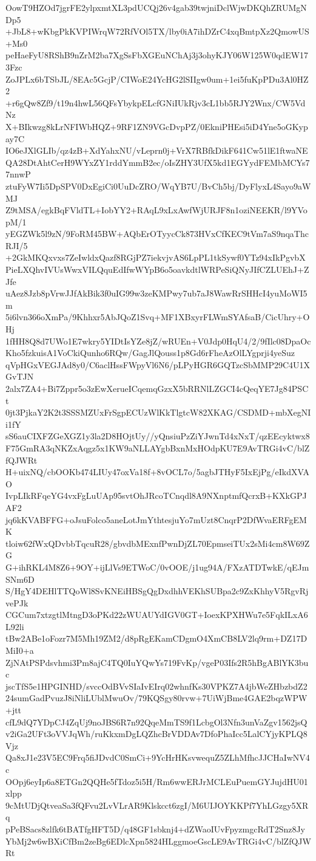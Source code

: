OowT9HZOd7jgrFE2ylpxmtXL3pdUCQj26v4gab39twjniDclWjwDKQhZRUMgNDp5
+JbL8+wKbgPkKVPIWrqW72RfVOl5TX/lby0iA7ihDZrC4xqBmtpXz2QmowUS+Ms0
peHaeFyU8RShB9nZrM2ba7XgSsFbXGEuNChAj3j3ohyKJY06W125W0qdEW173Fzc
ZoJPLx6bTSbJL/8EAc5GcjP/CIWoE24YcHG2lSIIgw0um+1ei5fuKpPDu3Al0HZ2
+r6gQw8Zf9/t19n4hwL56QFsYbykpELcfGNiIUkRjv3cL1bb5RJY2Wnx/CW5VdNz
X+BIkwzg8kLrNFIWbHQZ+9RF1ZN9VGcDvpPZ/0EkniPHEsi5iD4Yne5oGKypay7C
IO6eJXlGLIb/qz4zB+XdYahxNU/vLeprn0j+VrX7RBfkDikF641Cw51lE1ftwaNE
QA28DtAhtCerH9WYxZY1rddYmmB2ec/oIsZHY3UfX5kd1EGYydFEMbMCYs77nnwP
ztuFyW7Ii5DpSPV0DxEgiCi0UuDcZRO/WqYB7U/BvCh5bj/DyFlyxL4Sayo9aWMJ
Z9tMSA/egkBqFVldTL+IobYY2+RAqL9xLxAwfWjURJF8n1oziNEEKR/l9YVopM/1
yEGZWk5l9zN/9FoRM45BW+AQbErOTyycCk873HVxCfKEC9tVm7aS9nqaThcRJI/5
+2GkMKQxvxs7ZeIwldxQazf8RGjPZ7iekvjvAS6LpPL1tkSywf0YTz94xIkPgvbX
PieLXQhvIVUsWwxVILQquEdIfwWYpB6o5oavkdtlWRPeSiQNyJIfCZLUEhJ+ZJfe
uAez8Jzb8pVrwJJfAkBik3f0uIG99w3zeKMPwy7ub7aJ8WawRrSHHcI4yuMoWI5m
5i6lvn366oXmPa/9Khhxr5AbJQoZ1Svq+MF1XBxyrFLWmSYAfsaB/CicUhry+OHj
1fHH8Q8d7UWo1E7wkry5YIDtIsYZe8jZ/wRUEn+V0Jdp0HqU4/2/9fIlc08DpaOc
Kho5fzkuisA1VoCkiQunho6RQw/GagJlQouss1p8Gd6rFheAzOlLYgprji4yeSuz
qVpHGxVEGJAd8y0/C6aclHssFWpyVl6N6/pLPyHGR6GQTzcSbMMP29C4U1XGvTJN
2alx7ZA4+Bi7Zppr5o3zEwXerueICqemqGzxX5bRRNlLZGCI4cQeqYE7Jg84PSCt
0jt3PjkaY2K2t3SSSMZUxFrSgpECUzWlKkTlgtcW82XKAG/CSDMD+mbXegNIi1fY
sS6auCIXFZGeXGZ1y3la2D8HOjtUy//yQnsiuPzZiYJwnTd4xNxT/qzEEcyktwx8
F75GmRA3qNKZxAqgz5x1KW9aNLLAYgbBxnMxHOdpKU7E9AvTRGi4vC/blZfQJWRt
H+uixNQ/cbOOKb474LIUy47oxVa18f+8vOCL7o/5agbJTHyF5IxEjPg/eIkdXVAO
IvpLIkRFqeYG4vxFgLuUAp95svtOhJRcoTCnqdl8A9NXnptmfQcrxB+KXkGPJAF2
jq6kKVABFFG+oJsuFolco5aneLotJmYthtesjuYo7mUzt8CnqrP2DfWvaERFgEMK
tloiw62fWxQDvbbTqcuR28/gbvdbMExnfPwnDjZL70EpmseiTUx2sMi4cm8W69ZG
G+ihRKL4M8Z6+9OY+ijLlVs9ETWoC/0vOOE/j1ug94A/FXzATDTwkE/qEJmSNm6D
S/HgY4DEHlTTQoWl8SvKNEiHBSgQgDxdhhVEKhSUBpa2c9ZxKhhyV5RgvRjvePJk
CGCum7xtzgtlMtngD3oPKd22zWUAUYdIGV0GT+IoexKPXHWu7e5FqkILxA6L92li
tBw2ABe1oFozr7M5Mh19ZM2/d8pRgEKamCDgmO4XmCB8LV2lq9rm+DZ17DMiI0+a
ZjNAtPSPdsvhmi3Pm8ajC4TQ0IuYQwYs719FvKp/vgeP03Ifs2R5hBgABlYK3buc
jscTfS5e1HPGINHD/svccOdBVvSIaIvEIrq02whnfKs30VPKZ7A4jbWeZHbzbdZ2
24sumGadPvuzJ8iNliLUblMwuOv/79KQSgy80rvw+7UiWjBme4GAE2bqzWPW+jtt
cfL9dQ7YDpCJ4ZqUj9noJBS6R7n92QqeMmTS9f1LcbgOl3Nfn3unVaZgv1562jsQ
v2iGa2UFt3oVVJqWh/ruKkxmDgLQZhcBrVDDAv7DfoPhaIcc5LalCYjyKPLQ8Vjz
Qa8xJ1e23V5EC9Frq5fiJDvdC0SmCi+9YcHrHKsvwequZ5ZLhMfhcJJCHaIwNV4c
OOpj6eyIp6a8ETGn2QQHe5fTdoz5i5H/Rm6wwERJrMCLEuPuemGYJujdHU01xlpp
9cMtUDjQtveaSa3fQFvu2LvVLrAR9Klskcct6zgI/M6UIJOYKKPf7YhLGzgy5XRq
pPeBSacs8zlfk6tBATfgHFT5D/q48GF1sbknj4+dZWaoIUvFpyzmgcRdT2Snz8Jy
YbMj2w6wBXiCfBm2zeBg6EDlcXpn5824HLggmoeGscLE9AvTRGi4vC/blZfQJWRt
